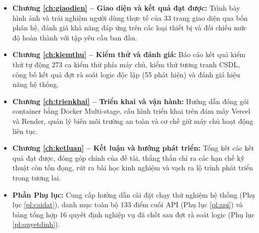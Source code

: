 \begin{itemize}
    \item \textbf{Chương \ref{ch:giaodien} -- Giao diện và kết quả đạt được:} Trình bày hình ảnh và trải nghiệm người dùng thực tế của 33 trang giao diện qua bốn phân hệ, đánh giá khả năng đáp ứng trên các loại thiết bị và đối chiếu mức độ hoàn thành với tập yêu cầu ban đầu.
    \item \textbf{Chương \ref{ch:kiemthu} -- Kiểm thử và đánh giá:} Báo cáo kết quả kiểm thử tự động 273 ca kiểm thử phía máy chủ, kiểm thử tương tranh CSDL, công bố kết quả đợt rà soát logic độc lập (55 phát hiện) và đánh giá hiệu năng hệ thống.
    \item \textbf{Chương \ref{ch:trienkhai} -- Triển khai và vận hành:} Hướng dẫn đóng gói container bằng Docker Multi-stage, cấu hình triển khai trên đám mây Vercel và Render, quản lý biến môi trường an toàn và cơ chế giữ máy chủ hoạt động liên tục.
    \item \textbf{Chương \ref{ch:ketluan} -- Kết luận và hướng phát triển:} Tổng kết các kết quả đạt được, đóng góp chính của đề tài, thẳng thắn chỉ ra các hạn chế kỹ thuật còn tồn đọng, rút ra bài học kinh nghiệm và vạch ra lộ trình phát triển trong tương lai.
    \item \textbf{Phần Phụ lục:} Cung cấp hướng dẫn cài đặt chạy thử nghiệm hệ thống (Phụ lục \ref{pl:caidat}), danh mục toàn bộ 133 điểm cuối API (Phụ lục \ref{pl:api}) và bảng tổng hợp 16 quyết định nghiệp vụ đã chốt sau đợt rà soát logic (Phụ lục \ref{pl:quyetdinh}).
\end{itemize}

